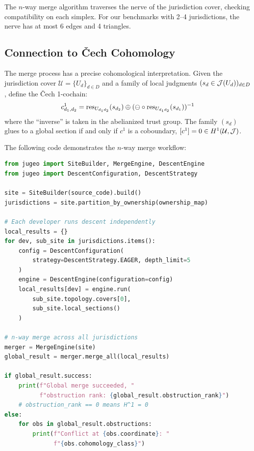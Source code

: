 \documentclass[11pt]{article}
\begin{document}
The $n$-way merge algorithm traverses the nerve of the jurisdiction cover,
checking compatibility on each simplex. For our benchmarks with 2--4
jurisdictions, the nerve has at most 6 edges and 4 triangles.

\subsection{Connection to \v{C}ech Cohomology}

The merge process has a precise cohomological interpretation. Given the
jurisdiction cover $\mathcal{U} = \{U_d\}_{d \in D}$ and a family of local
judgments $(s_d \in \mathcal{J}(U_d))_{d \in D}$, define the \v{C}ech 1-cochain:
\[
  c^1_{d_1, d_2} = \mathrm{res}_{U_{d_1 d_2}}(s_{d_2}) \oplus
  (\ominus \circ \mathrm{res}_{U_{d_1 d_2}}(s_{d_1}))^{-1}
\]
where the ``inverse'' is taken in the abelianized trust group. The family
$(s_d)$ glues to a global section if and only if $c^1$ is a coboundary, \ie
$[c^1] = 0 \in H^{1}(\mathcal{U}, \mathcal{J})$.

\begin{example}
The following code demonstrates the $n$-way merge workflow:

\begin{lstlisting}[language=Python,basicstyle=\small\ttfamily,frame=single,
  xleftmargin=1em]
from jugeo import SiteBuilder, MergeEngine, DescentEngine
from jugeo import DescentConfiguration, DescentStrategy

site = SiteBuilder(source_code).build()
jurisdictions = site.partition_by_ownership(ownership_map)

# Each developer runs descent independently
local_results = {}
for dev, sub_site in jurisdictions.items():
    config = DescentConfiguration(
        strategy=DescentStrategy.EAGER, depth_limit=5
    )
    engine = DescentEngine(configuration=config)
    local_results[dev] = engine.run(
        sub_site.topology.covers[0],
        sub_site.local_sections()
    )

# n-way merge across all jurisdictions
merger = MergeEngine(site)
global_result = merger.merge_all(local_results)

if global_result.success:
    print(f"Global merge succeeded, "
          f"obstruction rank: {global_result.obstruction_rank}")
    # obstruction_rank == 0 means H^1 = 0
else:
    for obs in global_result.obstructions:
        print(f"Conflict at {obs.coordinate}: "
              f"{obs.cohomology_class}")
\end{lstlisting}
\end{example}
\end{document}
